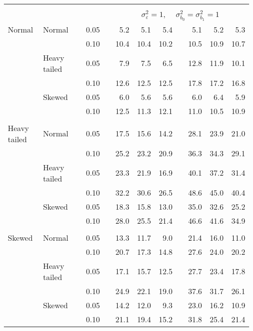 \begin{table}[ht]
\begin{scriptsize}
\begin{tabular}{ll p{.1cm} c p{.1cm} rrr p{.1cm} rrr}
&&&&&&&&&&&\\
& && && \multicolumn{7}{c}{$\sigma_{\varepsilon}^2 = 1$, \ \ $\sigma_{b_0}^2 = \sigma_{b_1}^2 = 1$} \\ \cline{6-12}
\rowcolor{gray!20} Normal & Normal &  & 0.05 &  & 5.2 & 5.1 & 5.4 &  & 5.1 & 5.2 & 5.3 \\ 
\rowcolor{gray!20}    &  &  & 0.10 &  & 10.4 & 10.4 & 10.2 &  & 10.5 & 10.9 & 10.7 \\ 
\rowcolor{gray!20}    & Heavy tailed &  & 0.05 &  & 7.9 & 7.5 & 6.5 &  & 12.8 & 11.9 & 10.1 \\ 
\rowcolor{gray!20}    &  &  & 0.10 &  & 12.6 & 12.5 & 12.5 &  & 17.8 & 17.2 & 16.8 \\ 
\rowcolor{gray!20}    & Skewed &  & 0.05 &  & 6.0 & 5.6 & 5.6 &  & 6.0 & 6.4 & 5.9 \\ 
\rowcolor{gray!20}    &  &  & 0.10 &  & 12.5 & 11.3 & 12.1 &  & 11.0 & 10.5 & 10.9 \\ 
&&&&&&&&&&&\\
  Heavy tailed & Normal &  & 0.05 &  & 17.5 & 15.6 & 14.2 &  & 28.1 & 23.9 & 21.0 \\ 
   &  &  & 0.10 &  & 25.2 & 23.2 & 20.9 &  & 36.3 & 34.3 & 29.1 \\ 
   & Heavy tailed &  & 0.05 &  & 23.3 & 21.9 & 16.9 &  & 40.1 & 37.2 & 31.4 \\ 
   &  &  & 0.10 &  & 32.2 & 30.6 & 26.5 &  & 48.6 & 45.0 & 40.4 \\ 
   & Skewed &  & 0.05 &  & 18.3 & 15.8 & 13.0 &  & 35.0 & 32.6 & 25.2 \\ 
   &  &  & 0.10 &  & 28.0 & 25.5 & 21.4 &  & 46.6 & 41.6 & 34.9 \\ 
&&&&&&&&&&&\\
  Skewed & Normal &  & 0.05 &  & 13.3 & 11.7 & 9.0 &  & 21.4 & 16.0 & 11.0 \\ 
   &  &  & 0.10 &  & 20.7 & 17.3 & 14.8 &  & 27.6 & 24.0 & 20.2 \\ 
   & Heavy tailed &  & 0.05 &  & 17.1 & 15.7 & 12.5 &  & 27.7 & 23.4 & 17.8 \\ 
   &  &  & 0.10 &  & 24.9 & 22.1 & 19.0 &  & 37.6 & 31.7 & 26.1 \\ 
   & Skewed &  & 0.05 &  & 14.2 & 12.0 & 9.3 &  & 23.0 & 16.2 & 10.9 \\ 
   &  &  & 0.10 &  & 21.1 & 19.4 & 15.2 &  & 31.8 & 25.4 & 21.4 \\ 


\end{tabular}
\end{scriptsize}
\end{table}
